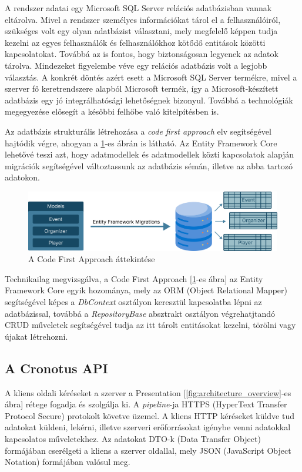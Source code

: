 A rendszer adatai egy Microsoft SQL Server relációs adatbázisban vannak eltárolva. Mivel a rendszer személyes információkat tárol el a felhasználóiról, szükséges volt egy olyan adatbázist választani, mely megfelelő képpen tudja kezelni az egyes felhasználók és felhasználókhoz kötődő entitások közötti kapcsolatokat. Továbbá az is fontos, hogy biztonságosan legyenek az adatok tárolva. Mindezeket  figyelembe véve egy relációs adatbázis volt a legjobb választás. A konkrét döntés azért esett a Microsoft SQL Server termékre, mivel a szerver fő keretrendszere alapból Microsoft termék, így a Microsoft-készített adatbázis egy jó integrálhatósági lehetőségnek bizonyul. Továbbá a technológiák megegyezése elősegít a későbbi felhőbe való kitelpítésben is.

Az adatbázis strukturális létrehozása a \textit{code first approach} elv segítségével hajtódik végre, ahogyan a \ref{fig:code_first_approach}-es ábrán is látható. Az Entity Framework Core lehetővé teszi azt, hogy adatmodellek és adatmodellek közti kapcsolatok alapján migrációk segítségével változtassunk az adatbázis sémán, illetve az abba tartozó adatokon.

\begin{figure}[h]
    \centering
    \includegraphics[width=\textwidth]{./images/code_first_approach.png}
    \caption{A Code First Approach áttekintése}
    \label{fig:code_first_approach}
\end{figure}

Technikailag megvizsgálva, a Code First Approach [\ref{fig:code_first_approach}-es ábra] az Entity Framework Core egyik hozománya, mely az ORM (Object Relational Mapper) segítségével képes a \textit{DbContext} osztályon keresztül kapcsolatba lépni az adatbázissal, továbbá a \textit{RepositoryBase} absztrakt osztályon végrehatjtandó CRUD műveletek segítségével tudja az itt tárolt entitásokat kezelni, törölni vagy újakat létrehozni.

\subsection{A Cronotus API}

A kliens oldali kéréseket a szerver a Presentation [\ref{fig:architecture_overview}-es ábra] rétege fogadja és szolgálja ki. A \textit{pipeline}-ja HTTPS (HyperText Transfer Protocol Secure) protokolt követve üzemel. A kliens HTTP kéréseket küldve tud adatokat küldeni, lekérni, illetve szerveri erőforrásokat igénybe venni adatokkal kapcsolatos műveletekhez. Az adatokat DTO-k (Data Transfer Object) formájában cserélgeti a kliens a szerver oldallal, mely JSON (JavaScript Object Notation) formájában valósul meg. 

